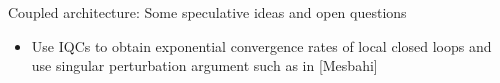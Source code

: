 \begin{frame}{Coupled architecture: Some speculative ideas and open questions}	
	\begin{itemize}
		\item Use IQCs to obtain exponential convergence rates of local closed loops and use  singular perturbation argument such as in [Mesbahi] 
	\end{itemize}
\end{frame}